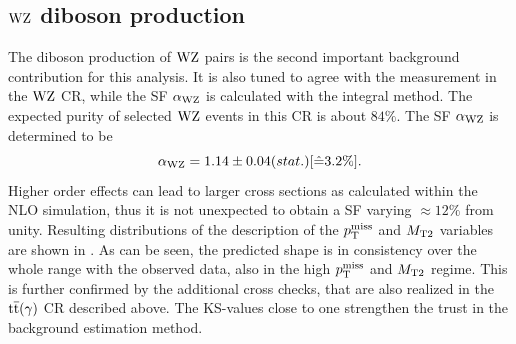 \subsection{$\mathrm{W}\mathrm{Z}$ diboson production}
The diboson production of $\mathrm{W}\mathrm{Z}$ pairs is the second important background contribution for this analysis. It is also tuned to agree with the measurement in the $\mathrm{W}\mathrm{Z}$ CR, while the SF $\alpha_{\mathrm{W}\mathrm{Z}}$ is calculated with the integral method. The expected purity of selected $\mathrm{W}\mathrm{Z}$ events in this CR is about $84\%$.
The SF $\alpha_{\mathrm{W}\mathrm{Z}}$ is determined to be
\begin{equation}\label{eq:AlphaWZ}
 \alpha_{\mathrm{W}\mathrm{Z}}=1.14 \pm 0.04 (stat.) [\hat{=}3.2\%].
\end{equation}
Higher order effects can lead to larger cross sections as calculated within the NLO simulation, thus it is not unexpected to obtain a SF varying $\approx12\%$ from unity. Resulting distributions of the description of the $p_{\mathrm{T}}^\text{miss}$ and $M_{\mathrm{T2}}$ variables are shown in . As can be seen, the predicted shape is in consistency over the whole range with the observed data, also in the high $p_{\mathrm{T}}^\text{miss}$ and $M_{\mathrm{T2}}$ regime. This is further confirmed by the additional cross checks, that are also realized in the ${\mathrm{t}\overline{\mathrm{t}}}(\gamma)$ CR described above. The KS-values close to one strengthen the trust in the background estimation method.
